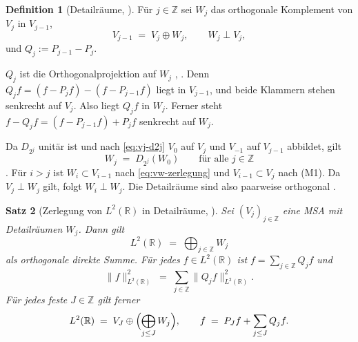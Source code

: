 \documentclass[a4paper,11pt,bibliography=totoc,listof=totoc,headinclude=true,cleardoublepage=empty,oneside]{scrbook}
\theoremstyle{plain}
\newtheorem{Satz}{Satz}[chapter]
\theoremstyle{definition}
\newtheorem{Definition}[Satz]{Definition}
\newcommand{\R}{\mathbb{R}}
\newcommand{\Z}{\mathbb{Z}}
\newcommand{\LZwei}{L^2(\R)}
\newcommand{\norm}[1]{\lVert #1 \rVert}
\begin{document}
\begin{Definition}[Detailräume, {\cite[Kap.~5.1, Gl.~(8)]{blatter}}] %
\label{def:detailraeume}
Für $j \in \Z$ sei $W_j$ das orthogonale Komplement von $V_j$ in $V_{j-1}$,
\begin{equation}
\label{eq:vw-zerlegung}
  V_{j-1} \;=\; V_j \oplus W_j,
  \qquad W_j \perp V_j ,
\end{equation}
und $Q_j := P_{j-1} - P_j$.
\end{Definition}

$Q_j$ ist die Orthogonalprojektion auf $W_j$ \cite[Kap.~5.1]{blatter}, %
\cite[Gl.~(2.2.9)]{lmr}. %
Denn $Q_j f = (f - P_j f) - (f - P_{j-1} f)$ liegt in $V_{j-1}$, und beide
Klammern stehen senkrecht auf $V_j$. Also liegt $Q_j f$ in $W_j$. Ferner steht
$f - Q_j f = (f - P_{j-1}f) + P_j f$ senkrecht auf $W_j$.

Da $D_{2^j}$ unitär ist und nach \eqref{eq:vj-d2j} $V_0$ auf $V_j$ und
$V_{-1}$ auf $V_{j-1}$ abbildet, gilt
\begin{equation}
\label{eq:wj-d2j}
  W_j \;=\; D_{2^{j}}(W_0) \qquad\text{für alle } j \in \Z
\end{equation}
\cite[Kap.~5.1, Gl.~(9)]{blatter}. %
Für $i > j$ ist $W_i \subset V_{i-1}$ nach \eqref{eq:vw-zerlegung} und
$V_{i-1} \subset V_j$ nach (M1). Da $V_j \perp W_j$ gilt,
folgt $W_i \perp W_j$. Die Detailräume sind also paarweise orthogonal
\cite[Prop.~(5.1)]{blatter}. %

\begin{Satz}[Zerlegung von $\LZwei$ in Detailräume, {\cite[Prop.~(5.1)]{blatter}}] %
\label{satz:zerlegung}
Sei $(V_j)_{j\in\Z}$ eine MSA mit Detailräumen $W_j$. Dann gilt
\begin{equation}
\label{eq:l2-zerlegung}
  \LZwei \;=\; \bigoplus_{j\in\Z} W_j
\end{equation}
als orthogonale direkte Summe. Für jedes $f \in \LZwei$ ist
$f = \sum_{j\in\Z} Q_j f$ und
\begin{equation}
\label{eq:energie-skalen}
  \norm{f}_{\LZwei}^2 \;=\; \sum_{j\in\Z} \norm{Q_j f}_{\LZwei}^2 .
\end{equation}
Für jedes feste $J \in \Z$ gilt ferner
\begin{equation}
\label{eq:l2-zerlegung-endlich}
  \LZwei \;=\; V_J \oplus \Bigl(\bigoplus_{j \le J} W_j\Bigr),
  \qquad
  f \;=\; P_J f + \sum_{j \le J} Q_j f .
\end{equation}
\end{Satz}
\end{document}
